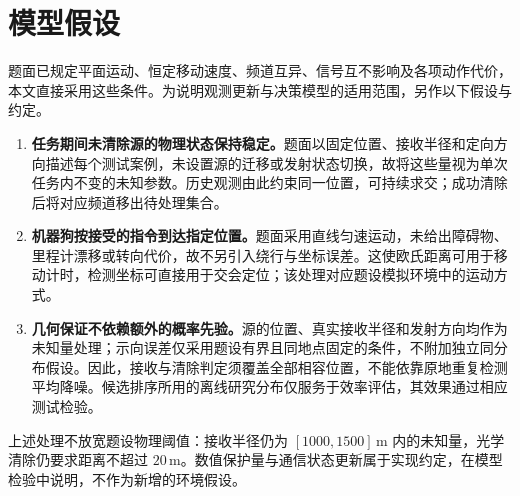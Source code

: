 \section{模型假设}

题面已规定平面运动、恒定移动速度、频道互异、信号互不影响及各项动作代价，本文直接采用这些条件。为说明观测更新与决策模型的适用范围，另作以下假设与约定。

\begin{enumerate}
  \item \textbf{任务期间未清除源的物理状态保持稳定。}题面以固定位置、接收半径和定向方向描述每个测试案例，未设置源的迁移或发射状态切换，故将这些量视为单次任务内不变的未知参数。历史观测由此约束同一位置，可持续求交；成功清除后将对应频道移出待处理集合。
  \item \textbf{机器狗按接受的指令到达指定位置。}题面采用直线匀速运动，未给出障碍物、里程计漂移或转向代价，故不另引入绕行与坐标误差。这使欧氏距离可用于移动计时，检测坐标可直接用于交会定位；该处理对应题设模拟环境中的运动方式。
  \item \textbf{几何保证不依赖额外的概率先验。}源的位置、真实接收半径和发射方向均作为未知量处理；示向误差仅采用题设有界且同地点固定的条件，不附加独立同分布假设。因此，接收与清除判定须覆盖全部相容位置，不能依靠原地重复检测平均降噪。候选排序所用的离线研究分布仅服务于效率评估，其效果通过相应测试检验。
\end{enumerate}

上述处理不放宽题设物理阈值：接收半径仍为 $[1000,1500]\,\mathrm{m}$ 内的未知量，光学清除仍要求距离不超过 $20\,\mathrm{m}$。数值保护量与通信状态更新属于实现约定，在模型检验中说明，不作为新增的环境假设。
